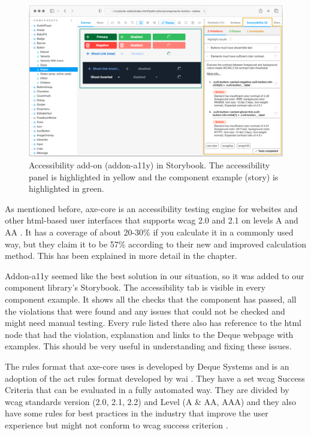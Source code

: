 \documentclass{master_thesis}
\begin{document}
\begin{figure}[h]
	\includegraphics[width=\textwidth]{img/addon-a11y.png}
	\caption{Accessibility add-on (addon-a11y) in Storybook. The accessibility panel is highlighted in yellow and the component example (story) is highlighted in green.}
	\label{fig:addon-a11y}
\end{figure}

As mentioned before, axe-core is an accessibility testing engine for websites and other \ac{html}-based user interfaces that supports \ac{wcag} 2.0 and 2.1 on levels A and AA \citep{Deque2023}. It has a coverage of about 20-30\% if you calculate it in a commonly used way, but they claim it to be 57\% according to their new and improved calculation method. This has been explained in more detail in the  chapter.

Addon-a11y seemed like the best solution in our situation, so it was added to our component library’s Storybook. The accessibility tab is visible in every component example. It shows all the checks that the component has passed, all the violations that were found and any issues that could not be checked and might need manual testing. Every rule listed there also has reference to the \ac{html} node that had the violation, explanation and links to the Deque webpage with examples. This should be very useful in understanding and fixing these issues.

The rules format that axe-core uses is developed by Deque Systems and is an adoption of the \ac{act} rules format developed by \ac{wai} \citep{Fiers2017}. They have a set \ac{wcag} Success Criteria that can be evaluated in a fully automated way. They are divided by \ac{wcag} standards version (2.0, 2.1, 2.2) and Level (A \& AA, AAA) and they also have some rules for best practices in the industry that improve the user experience but might not conform to \ac{wcag} success criterion \citep{Fiers2023}.
\end{document}
